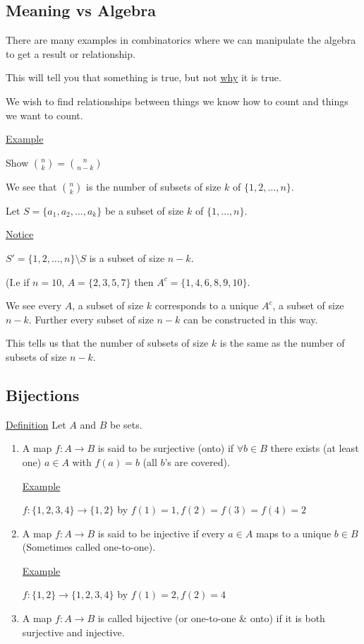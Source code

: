 \documentclass{article}
\begin{document}
\subsection{Meaning vs Algebra}

There are many examples in combinatorics where we can manipulate the algebra to get a result or relationship. 

This will tell you that something is true, but not \underline{why} it is true. 

We wish to find relationships between things we know how to count and things we want to count. 

\underline{Example}

Show $\binom{n}{k} = \binom{n}{n-k}$

We see that $\binom{n}{k}$ is the number of subsets of size $k$ of $\{1,2,\ldots,n\}$.

Let $S = \{a_1,a_2,\ldots,a_k\}$ be a subset of size $k$ of $\{1,\ldots,n\}$. 

\underline{Notice}

$S' = \{1,2,\ldots,n\} \setminus S$ is a subset of size $n-k$. 

(I.e if $n=10$, $A = \{2,3,5,7\}$ then $A^c = \{1,4,6,8,9,10\}$. 

We see every $A$, a subset of size $k$ corresponds to a unique $A^c$, a subset of size $n-k$. Further every subset of size $n-k$ can be constructed in this way. 

This tells us that the number of subsets of size $k$ is the same as the number of subsets of size $n-k$. 


\subsection{Bijections}

\underline{Definition} Let $A$ and $B$ be sets.

\begin{enumerate}
    \item A map $f: A \to B $ is said to be surjective (onto) if $\forall b \in B$ there exists (at least one) $a \in A$ with $f(a)=b$ (all $b$'s are covered). 

\underline{Example}

$f: \{1,2,3,4\} \to \{1,2\}$ by $f(1) = 1, f(2) = f(3) = f(4) = 2$

\item A map $f: A \to B$ is said to be injective if every $a \in A$ maps to a unique $b \in B$ (Sometimes called one-to-one). 

\underline{Example}

$f: \{1,2\} \to \{1,2,3,4\}$ by $f(1) = 2, f(2) = 4$

\item A map $f: A \to B$ is called bijective (or one-to-one \& onto) if it is both surjective and injective.

\end{enumerate}
\end{document}
